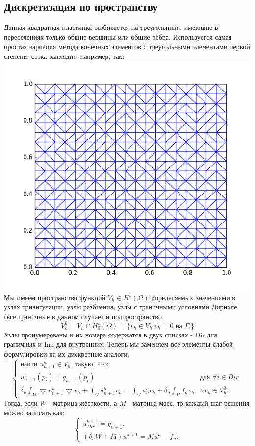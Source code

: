 \documentclass[paper=a4, fontsize=13pt]{scrartcl} %
\numberwithin{equation}{section} %
\numberwithin{figure}{section} %
\numberwithin{table}{section} %
\begin{document}
\subsection{Дискретизация по пространству}
Данная квадратная пластинка разбивается на треугольники, имеющие в пересечениях только общие вершины или общие рёбра.
Используется самая простая вариация метода конечных элементов с треугольными элементами первой степени, сетка выглядит, например, так: \\
\includegraphics[scale=0.5]{mesh} \\
Мы имеем пространство функций $V_h \in H^1(\Omega)$ определяемых значениями в узлах триангуляции, узлы разбиения, узлы с граничными условиями Дирихле (все граничные в данном случае) и подпространство $$V^0_h = V_h \cap H^1_0(\Omega) = \{v_h \in V_h | v_h = 0 \text{ на $\Gamma$.}\}$$ Узлы пронумерованы и их номера содержатся в двух списках - Dir для граничных и Ind для внутренних. Теперь мы заменяем все элементы слабой формулировки на их дискретные аналоги:
    \[
        \begin{cases}
            \text{найти } u^h_{n+1} \in V_h\text{, такую, что:} \\
            u^h_{n+1}(p_i) = g_{n+1}(p_i)& \text{для $\forall i \in Dir$,} \\
            \delta_n \int_{\Omega} \bigtriangledown u^h_{n+1} \bigtriangledown v_h + \int_{\Omega} u^h_{n+1}v_h = \int_{\Omega} u^h_{n}v_h + \delta_n \int_{\Omega} f_{n}v_h& \forall v_h \in V^0_h.
        \end{cases}
    \]
Тогда, если $W$ - матрица жёсткости, а $M$ - матрица масс, то каждый шаг решения можно записать как:
    \[
        \begin{cases}
            u^{n+1}_{Dir} = g_{n+1}, \\
            (\delta_n W + M) u^{n+1} = M u^n - f_n.
        \end{cases}
    \]
\newpage
\end{document}
